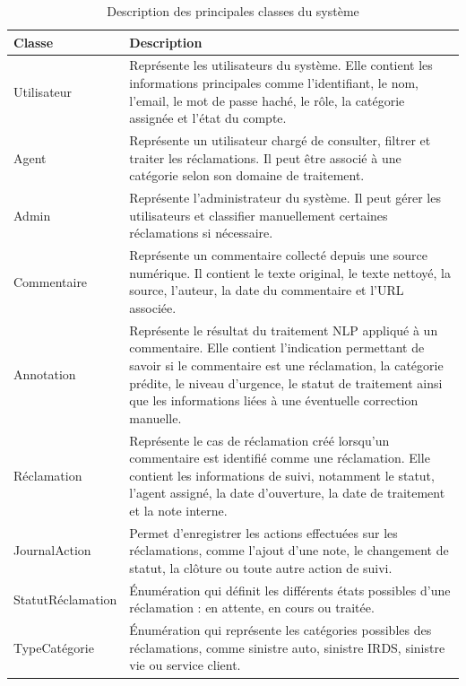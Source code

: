 \documentclass[12pt,a4paper,oneside]{report}
\begin{document}
\begin{table}[H]
\centering
\small
\caption{Description des principales classes du système}
\label{tab:classes_systeme}
\begin{tabular}{|p{3.5cm}|p{9cm}|}
\hline
\textbf{Classe} & \textbf{Description} \\
\hline
Utilisateur & Représente les utilisateurs du système. Elle contient les informations principales comme l’identifiant, le nom, l’email, le mot de passe haché, le rôle, la catégorie assignée et l’état du compte. \\
\hline
Agent & Représente un utilisateur chargé de consulter, filtrer et traiter les réclamations. Il peut être associé à une catégorie selon son domaine de traitement. \\
\hline
Admin & Représente l’administrateur du système. Il peut gérer les utilisateurs et classifier manuellement certaines réclamations si nécessaire. \\
\hline
Commentaire & Représente un commentaire collecté depuis une source numérique. Il contient le texte original, le texte nettoyé, la source, l’auteur, la date du commentaire et l’URL associée. \\
\hline
Annotation & Représente le résultat du traitement NLP appliqué à un commentaire. Elle contient l’indication permettant de savoir si le commentaire est une réclamation, la catégorie prédite, le niveau d’urgence, le statut de traitement ainsi que les informations liées à une éventuelle correction manuelle. \\
\hline
Réclamation & Représente le cas de réclamation créé lorsqu’un commentaire est identifié comme une réclamation. Elle contient les informations de suivi, notamment le statut, l’agent assigné, la date d’ouverture, la date de traitement et la note interne. \\
\hline
JournalAction & Permet d’enregistrer les actions effectuées sur les réclamations, comme l’ajout d’une note, le changement de statut, la clôture ou toute autre action de suivi. \\
\hline
StatutRéclamation & Énumération qui définit les différents états possibles d’une réclamation : en attente, en cours ou traitée. \\
\hline
TypeCatégorie & Énumération qui représente les catégories possibles des réclamations, comme sinistre auto, sinistre IRDS, sinistre vie ou service client. \\
\hline
\end{tabular}
\end{table}
\end{document}
